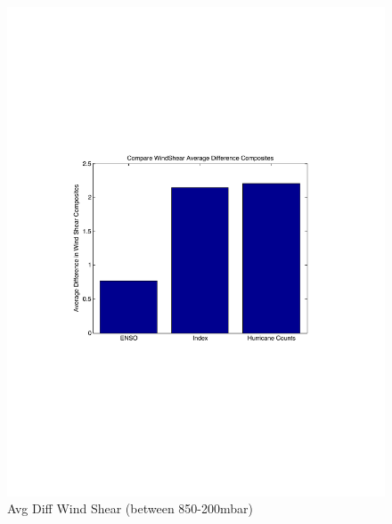 \documentclass[a4paper,10pt]{article}
\begin{document}
\begin{figure}[ht]
\begin{minipage}[b]{0.6\linewidth}
\includegraphics[width=\textwidth]{figs/sensitivityResults/compositeBarGraphs/avgDiffWindShearBarGraph.pdf}
\caption{Avg Diff Wind Shear (between 850-200mbar)}
\label{fig:figure28}
\end{minipage}
\end{figure}
\end{document}
